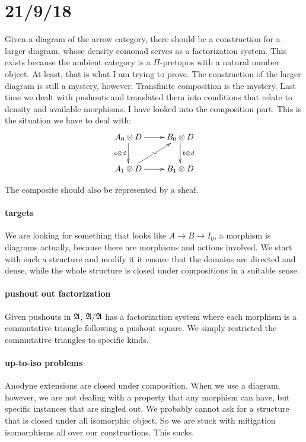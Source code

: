 \documentclass[csh.tex]{subfiles}
\begin{document}
\section{21/9/18}
Given a diagram of the arrow category, there should be a construction for a larger diagram, whose density comonad serves as a factorization system. This exists because the ambient category is a $\Pi$-pretopos with a natural number object. At least, that is what I am trying to prove.
The construction of the larger diagram is still a mystery, however.
Transfinite composition is the mystery. Last time we dealt with pushouts and translated them into conditions that relate to density and available morphisms.
I have looked into the composition part. 
This is the situation we have to deal with:
\[\xymatrix{
A_0\otimes D\ar[d]_{a\otimes d} \ar[r] & B_0\otimes D \ar[d]^{b\otimes d} \\
A_1\otimes D\ar[ur]|{\sim} \ar[r] & B_1\otimes D
}\]

The composite should also be represented by a sheaf.

\paragraph{targets}
We are looking for something that looks like $A\to B\to I_0$, a morphism is diagrams actually, because there are morphisms and actions involved. We start with such a structure and modify it it ensure that the domains are directed and dense, while the whole structure is closed under compositions in a suitable sense.

\paragraph{pushout out factorization}
Given pushouts in $\mathfrak A$, $\mathfrak A/\mathfrak A$ has a factorization system where each morphism is a commutative triangle following a pushout square. We simply restricted the commutative triangles to specific kinds.

\paragraph{up-to-iso problems}
Anodyne extensions are closed under composition. When we use a diagram, however, we are not dealing with a property that any morphism can have, but specific instances that are singled out. We probably cannot ask for a structure that is closed under all isomorphic object. So we are stuck with mitigation isomorphisms all over our constructions. This sucks.
\end{document}
